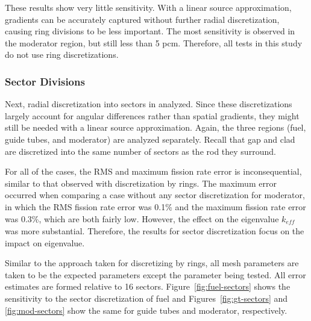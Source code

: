 These results show very little sensitivity. With a linear source approximation, gradients can be accurately captured without further radial discretization, causing ring divisions to be less important. The most sensitivity is observed in the moderator region, but still less than 5 pcm. Therefore, all tests in this study do not use ring discretizations. 

\subsubsection{Sector Divisions}

Next, radial discretization into sectors in analyzed. Since these  discretizations largely account for angular differences rather than spatial gradients, they might still be needed with a linear source approximation. Again, the three regions (fuel, guide tubes, and moderator) are analyzed separately. Recall that gap and clad are discretized into the same number of sectors as the rod they surround.

For all of the cases, the RMS and maximum fission rate error is inconsequential, similar to that observed with discretization by rings.  The maximum error occurred when comparing a case without any sector discretization for moderator, in which the RMS fission rate error was 0.1\% and the maximum fission rate error was 0.3\%, which are both fairly low. However, the effect on the eigenvalue $k_{\textit{eff}}$ was more substantial. Therefore, the results for sector discretization focus on the impact on eigenvalue.

Similar to the approach taken for discretizing by rings, all mesh parameters are taken to be the expected parameters except the parameter being tested. All error estimates are formed relative to 16 sectors. Figure~\ref{fig:fuel-sectors} shows the sensitivity to the sector discretization of fuel and Figures~\ref{fig:gt-sectors} and \ref{fig:mod-sectors} show the same for guide tubes and moderator, respectively.
 
